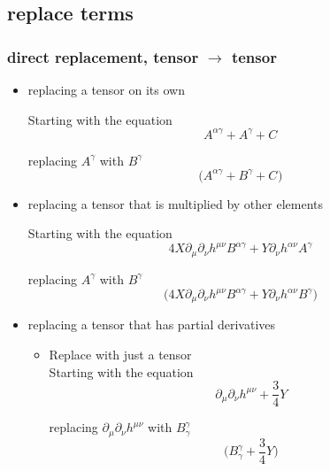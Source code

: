 \documentclass{article}
\def\){\Big)}
\def\({\Big(}
\begin{document}
{\color{blue}

\subsection{replace terms}

\subsubsection{direct replacement, tensor $\rightarrow$ tensor}

\begin{itemize}

\item{replacing a tensor on its own}

Starting with the equation
\begin{equation}
A^{\alpha \gamma} +  A^{\gamma}  + C^{} 
\end{equation}

replacing $ A^{\gamma} $ with $ B^{\gamma} $
\begin{equation}
\( A^{\alpha \gamma} + B^{\gamma} + C^{} \)
\end{equation}


\item{replacing a tensor that is multiplied by other elements}

Starting with the equation
\begin{equation}
4 X \partial_{\mu} \partial_{\nu} h^{\mu \nu} B^{\alpha \gamma} +Y \partial_{\nu} h^{\alpha \nu} A^{\gamma}
\end{equation}

replacing $ A^{\gamma} $ with $ B^{\gamma} $
\begin{equation}
\(4 X \partial_{\mu} \partial_{\nu} h^{\mu \nu} B^{\alpha \gamma} +Y \partial_{\nu} h^{\alpha \nu} B^{\gamma} \)
\end{equation}


\item{replacing a tensor that has partial derivatives}

\begin{itemize}

\item{Replace with just a tensor}\\

Starting with the equation
\begin{equation}
\partial_{\mu} \partial_{\nu} h^{\mu \nu} + \frac{3}{4} Y
\end{equation}

replacing $ \partial_{\mu} \partial_{\nu} h^{\mu \nu} $ with $ B^{\gamma}_{\gamma} $
\begin{equation}
\( B_{\gamma}^{\gamma} +\frac{3}{4} Y \)
\end{equation}


\end{itemize}
\end{itemize}}
\end{document}

